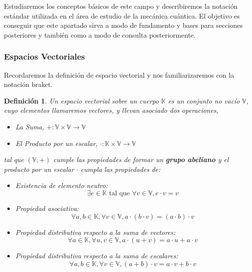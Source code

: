 \documentclass[a4paper]{article}
\newtheorem{deff}{Definición}[section]
\numberwithin{equation}{section}
\begin{document}
Estudiaremos los conceptos básicos de este campo y describiremos la notación estándar utilizada en el área de estudio de la mecánica cuántica. El objetivo es conseguir que este apartado sirva a modo de fundamento y bases para secciones posteriores y también como a modo de consulta posteriormente.

\subsubsection{Espacios Vectoriales}

Recordaremos la definición de espacio vectorial y nos familiarizaremos con la notación braket.%

\begin{deff}

Un espacio vectorial sobre un cuerpo $\mathbb{K}$ es un conjunto no vacío $\mathbb{V}$, cuyo elementos llamaremos vectores, y llevan asociado dos operaciones, 
\begin{itemize}

\item La Suma, $\textbf{+}: \mathbb{V} \times \mathbb{V} \longrightarrow \mathbb{V}$

\item El Producto por un escalar, $\textbf{$\cdot$}:\mathbb{K} \times \mathbb{V} \longrightarrow \mathbb{V}$

\end{itemize}
tal que $(\mathbb{V},+)$ cumple las propiedades de formar un \textbf{grupo abeliano} y el producto por un escalar $\cdot$ cumpla las propiedades de:
\begin{itemize}

\item Existencia de elemento neutro:
\begin{equation}
\exists e \in \mathbb{K} \text{ tal que } \forall v \in \mathbb{V},  e \cdot v = v
\end{equation}

\item Propiedad asociativa:
\begin{equation}
\forall a, b \in \mathbb{K}, \forall v \in \mathbb{V}, a\cdot(b\cdot v) = (a\cdot b)\cdot v
\end{equation}

\item Propiedad distributiva respecto a la suma de vectores:
\begin{equation}
\forall a \in \mathbb{K}, \forall u, v \in \mathbb{V}, a\cdot(u + v) = a\cdot u + a\cdot v
\end{equation}

\item Propiedad distributiva respecto a la suma de escalares:
\begin{equation}
\forall a, b \in \mathbb{K}, \forall v \in \mathbb{V}, (a + b)\cdot v = a\cdot v + b\cdot v
\end{equation}

\end{itemize}

\end{deff}
\end{document}
